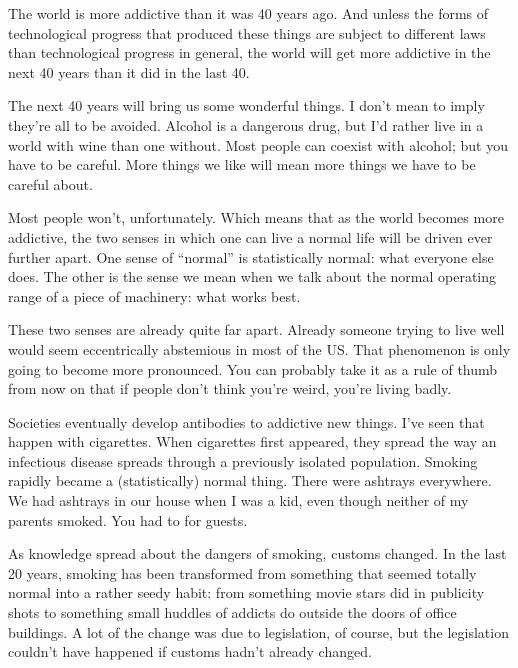 The world is more addictive than it was 40 years ago. And unless the
forms of technological progress that produced these things are subject
to different laws than technological progress in general, the world will
get more addictive in the next 40 years than it did in the last 40.

The next 40 years will bring us some wonderful things. I don't mean to
imply they're all to be avoided. Alcohol is a dangerous drug, but I'd
rather live in a world with wine than one without. Most people can
coexist with alcohol; but you have to be careful. More things we like
will mean more things we have to be careful about.

Most people won't, unfortunately. Which means that as the world becomes
more addictive, the two senses in which one can live a normal life will
be driven ever further apart. One sense of ``normal'' is statistically
normal: what everyone else does. The other is the sense we mean when we
talk about the normal operating range of a piece of machinery: what
works best.

These two senses are already quite far apart. Already someone trying to
live well would seem eccentrically abstemious in most of the US. That
phenomenon is only going to become more pronounced. You can probably
take it as a rule of thumb from now on that if people don't think you're
weird, you're living badly.

Societies eventually develop antibodies to addictive new things. I've
seen that happen with cigarettes. When cigarettes first appeared, they
spread the way an infectious disease spreads through a previously
isolated population. Smoking rapidly became a (statistically) normal
thing. There were ashtrays everywhere. We had ashtrays in our house when
I was a kid, even though neither of my parents smoked. You had to for
guests.

As knowledge spread about the dangers of smoking, customs changed. In
the last 20 years, smoking has been transformed from something that
seemed totally normal into a rather seedy habit: from something movie
stars did in publicity shots to something small huddles of addicts do
outside the doors of office buildings. A lot of the change was due to
legislation, of course, but the legislation couldn't have happened if
customs hadn't already changed.

